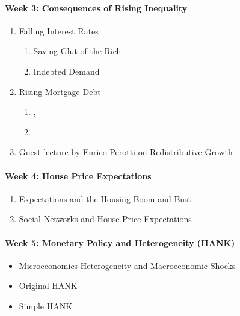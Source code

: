 \documentclass[a4paper,11pt]{article}
\begin{document}
\paragraph{Week 3: Consequences of Rising Inequality}

\begin{enumerate}
\item Falling Interest Rates
  \begin{enumerate}
  \item Saving Glut of the Rich \citep{kumhof2015inequality}
  \item Indebted Demand \citep{mian2021indebted-demand}
  \end{enumerate}
\item Rising Mortgage Debt
  \begin{enumerate}
  \item \citet{bertrand2016trickle}, \citet{bellet2019mcmansion}
  \item \citet{drechsel2021falling-behind}
  \end{enumerate}
  
\item Guest lecture by Enrico Perotti on Redistributive Growth
\end{enumerate}

\paragraph{Week 4: House Price Expectations}
\begin{enumerate}
\item Expectations and the Housing Boom and Bust \citep{kaplan2018microeconomic}
\item Social Networks and House Price Expectations \citep{bailey2019beliefs-leverage,bailey2018housing}
\end{enumerate}

\paragraph{Week 5: Monetary Policy and Heterogeneity (HANK)}
\begin{itemize}
\item Microeconomics Heterogeneity and Macroeconomic Shocks \citep{kaplan2018microeconomic}
\item Original HANK \citep{kaplan2018monetary}
\item Simple HANK \citep{bilbiie2018analytical}
\end{itemize}
\end{document}
